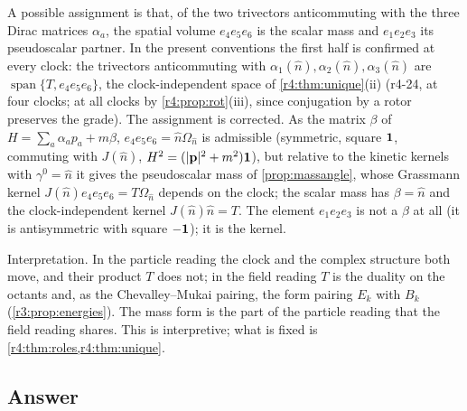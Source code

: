 \begin{remark}
\label{r4:rem:V}
A possible assignment is that, of the two trivectors anticommuting with the three Dirac matrices
$\alpha_a$, the spatial volume $e_4e_5e_6$ is the scalar mass and $e_1e_2e_3$ its pseudoscalar partner. In the present conventions the first half is
confirmed at every clock: the trivectors anticommuting with $\alpha_1(\hat n),\alpha_2(\hat n),\alpha_3(\hat n)$ are $\operatorname{span}\{T,e_4e_5e_6\}$, the clock-independent space of
\cref{r4:thm:unique}(ii) (r4-24, at four clocks; at all clocks by \cref{r4:prop:rot}(iii), since conjugation by a rotor preserves the grade). The assignment is corrected. As the matrix $\beta$ of $H=\sum_a\alpha_ap_a+m\beta$, $e_4e_5e_6=\hat n\Omega_{\hat n}$ is admissible
(symmetric, square $\mathbf 1$, commuting with $J(\hat n)$, $H^2=(|\mathbf p|^2+m^2)\mathbf 1$), but relative to the kinetic kernels with $\gamma^0=\hat n$ it gives the pseudoscalar mass
of \cref{prop:massangle}, whose Grassmann kernel $J(\hat n)e_4e_5e_6=T\Omega_{\hat n}$ depends on the clock; the scalar mass has $\beta=\hat n$ and the
clock-independent kernel $J(\hat n)\hat n=T$. The element $e_1e_2e_3$ is not a $\beta$ at all (it is antisymmetric with square $-\mathbf 1$); it is the kernel.
\end{remark}

Interpretation. In the particle reading the clock and the complex structure both move, and their product $T$ does not; in the field reading $T$ is
the duality on the octants and, as the Chevalley--Mukai pairing, the form pairing $E_k$ with $B_k$ (\cref{r3:prop:energies}). The mass form is the part of
the particle reading that the field reading shares. This is interpretive; what is fixed is \cref{r4:thm:roles,r4:thm:unique}.

\subsection{Answer}
\label{r4:sec:answer}

